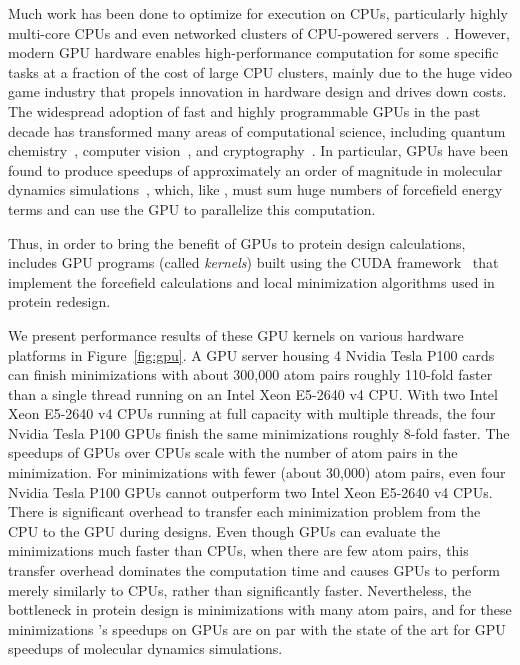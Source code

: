 Much work has been done to optimize \osprey for execution on CPUs, particularly highly multi-core CPUs and even networked clusters of CPU-powered servers~\cite{minBounds_DACS,cloud_OSPREY}. However, modern GPU hardware enables high-performance computation for some specific tasks at a fraction of the cost of large CPU clusters, mainly due to the huge video game industry that propels innovation in hardware design and drives down costs. The widespread adoption of fast and highly programmable GPUs in the past decade has transformed many areas of computational science, including quantum chemistry~\cite{GPU_QM}, computer vision~\cite{ResNet}, and cryptography~\cite{GPU_crypto}.  In particular, GPUs have been found to produce speedups of approximately an order of magnitude in molecular dynamics simulations~\cite{HOOMD_GPU,AMBER_GPU_microseconds,GROMACS_GPU}, which, like \osprey, must sum huge numbers of forcefield energy terms and can use the GPU to parallelize this computation.  

Thus, in order to bring the benefit of GPUs to protein design calculations,  includes GPU programs (called {\it kernels}) built using the CUDA framework~\cite{nvidia2010programming} that implement the forcefield calculations and local minimization algorithms used in protein redesign.

We present performance results of these GPU kernels on various hardware platforms in Figure~\ref{fig:gpu}. A GPU server housing 4 Nvidia Tesla P100 cards can finish minimizations with about 300,000 atom pairs roughly 110-fold faster than a single thread running on an Intel Xeon E5-2640 v4 CPU. With two Intel Xeon E5-2640 v4 CPUs running at full capacity with multiple threads, the four Nvidia Tesla P100 GPUs finish the same minimizations roughly 8-fold faster. The speedups of GPUs over CPUs scale with the number of atom pairs in the minimization. For minimizations with fewer (about 30,000) atom pairs, even four Nvidia Tesla P100 GPUs cannot outperform two Intel Xeon E5-2640 v4 CPUs. There is significant overhead to transfer each minimization problem from the CPU to the GPU during designs. Even though GPUs can evaluate the minimizations much faster than CPUs, when there are few atom pairs, this transfer overhead dominates the computation time and causes GPUs to perform merely similarly to CPUs, rather than significantly faster.  Nevertheless, the bottleneck in protein design is minimizations with many atom pairs, and for these minimizations \osprey's speedups on GPUs are on par with the state of the art for GPU speedups of molecular dynamics simulations.  

